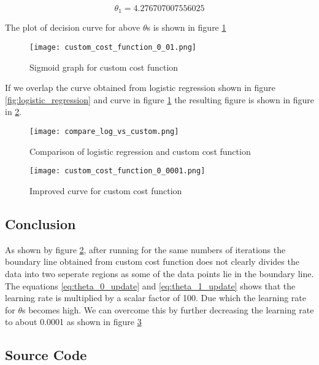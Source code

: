 \begin{equation}
\theta_1 = 4.276707007556025
\end{equation}

The plot of decision curve for above $\theta$s is shown in figure \ref{fig:custom_cost_function}

\begin{figure}[!ht]
  \texttt{[image: custom\_cost\_function\_0\_01.png]}
  \caption{Sigmoid graph for custom cost function}
  \label{fig:custom_cost_function}
\end{figure}

If we overlap the curve obtained from logistic regression shown in figure \ref{fig:logistic_regression} and curve in figure \ref{fig:custom_cost_function}
the resulting figure is shown in figure in \ref{fig:compare_log_vs_custom}.

\begin{figure}[!ht]
  \texttt{[image: compare\_log\_vs\_custom.png]}
  \caption{Comparison of logistic regression and custom cost function}
  \label{fig:compare_log_vs_custom}
\end{figure}

\begin{figure}[!ht]
  \texttt{[image: custom\_cost\_function\_0\_0001.png]}
  \caption{Improved curve for custom cost function}
  \label{fig:custom_cost_function_0_0001}
\end{figure}

\subsection{Conclusion}
As shown by figure \ref{fig:compare_log_vs_custom}, after running for the same numbers of iterations the boundary line obtained
from custom cost function does not clearly divides the data into two seperate regions as some of the data points lie in the boundary line.
The equations \ref{eq:theta_0_update} and \ref{eq:theta_1_update} shows that the learning rate is multiplied by a scalar factor of 100. Due which the
learning rate for $\theta$s becomes high. We can overcome this by further decreasing the learning rate to about 0.0001 as shown in figure \ref{fig:custom_cost_function_0_0001}

\subsection{Source Code}

